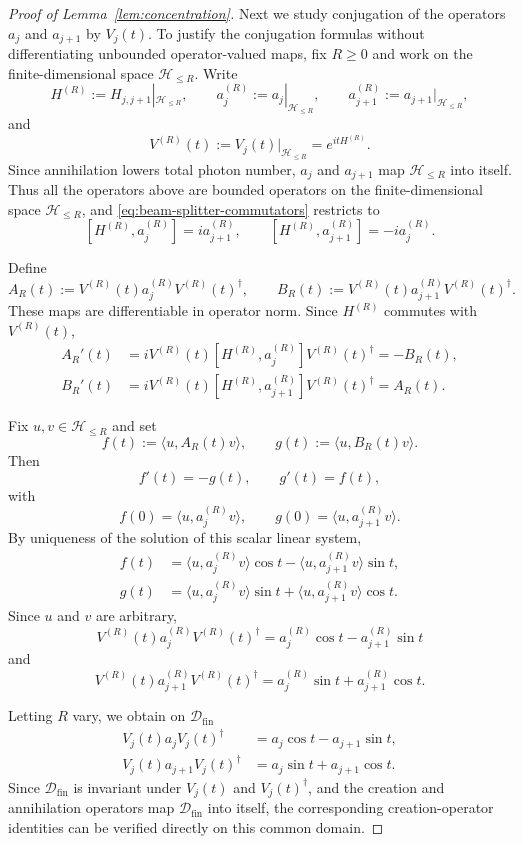 \documentclass{article}
\theoremstyle{named}
\theoremstyle{named1}
\newcommand{\cH}{\mathcal H}
\theoremstyle{plain}
\theoremstyle{remark}
\begin{document}
\begin{proof}[Proof of Lemma~\ref{lem:concentration}]
Next we study conjugation of the operators $a_j$ and $a_{j+1}$ by $V_j(t)$. To justify the conjugation formulas without differentiating unbounded
operator-valued maps, fix $R\geq0$ and work on the finite-dimensional
space $\cH_{\leq R}$.  Write
\[
    H^{(R)}
    :=
    H_{j,j+1}|_{\cH_{\leq R}},
    \qquad
    a_j^{(R)}
    :=
    a_j|_{\cH_{\leq R}},
    \qquad
    a_{j+1}^{(R)}
    :=
    a_{j+1}|_{\cH_{\leq R}},
\]
and
\[
    V^{(R)}(t)
    :=
    V_j(t)|_{\cH_{\leq R}}
    =
    e^{itH^{(R)}} .
\]
Since annihilation lowers total photon number, $a_j$ and $a_{j+1}$ map
$\cH_{\leq R}$ into itself.  Thus all the operators above are bounded
operators on the finite-dimensional space $\cH_{\leq R}$, and
\eqref{eq:beam-splitter-commutators} restricts to
\[
    [H^{(R)},a_j^{(R)}]
    =
    ia_{j+1}^{(R)},
    \qquad
    [H^{(R)},a_{j+1}^{(R)}]
    =
    -ia_j^{(R)}.
\]

Define
\[
    A_R(t)
    :=
    V^{(R)}(t)a_j^{(R)}V^{(R)}(t)^\dagger,
    \qquad
    B_R(t)
    :=
    V^{(R)}(t)a_{j+1}^{(R)}V^{(R)}(t)^\dagger .
\]
These maps are differentiable in operator norm.  Since
$H^{(R)}$ commutes with $V^{(R)}(t)$,
\begin{align*}
    A_R'(t)
    &=
    iV^{(R)}(t)
    [H^{(R)},a_j^{(R)}]
    V^{(R)}(t)^\dagger
    =
    -B_R(t),\\
    B_R'(t)
    &=
    iV^{(R)}(t)
    [H^{(R)},a_{j+1}^{(R)}]
    V^{(R)}(t)^\dagger
    =
    A_R(t).
\end{align*}

Fix $u,v\in\cH_{\leq R}$ and set
\[
    f(t)
    :=
    \langle u,A_R(t)v\rangle,
    \qquad
    g(t)
    :=
    \langle u,B_R(t)v\rangle .
\]
Then
\[
    f'(t)=-g(t),
    \qquad
    g'(t)=f(t),
\]
with
\[
    f(0)=\langle u,a_j^{(R)}v\rangle,
    \qquad
    g(0)=\langle u,a_{j+1}^{(R)}v\rangle.
\]
By uniqueness of the solution of this scalar linear system,
\begin{align*}
    f(t)
    &=
    \langle u,a_j^{(R)}v\rangle\cos t
    -
    \langle u,a_{j+1}^{(R)}v\rangle\sin t,\\
    g(t)
    &=
    \langle u,a_j^{(R)}v\rangle\sin t
    +
    \langle u,a_{j+1}^{(R)}v\rangle\cos t .
\end{align*}
Since $u$ and $v$ are arbitrary,
\[
    V^{(R)}(t)a_j^{(R)}V^{(R)}(t)^\dagger
    =
    a_j^{(R)}\cos t-a_{j+1}^{(R)}\sin t
\]
and
\[
    V^{(R)}(t)a_{j+1}^{(R)}V^{(R)}(t)^\dagger
    =
    a_j^{(R)}\sin t+a_{j+1}^{(R)}\cos t .
\]

Letting $R$ vary, we obtain on $\mathscr D_{\mathrm{fin}}$
\begin{align}
    V_j(t)a_jV_j(t)^\dagger
    &=
    a_j\cos t-a_{j+1}\sin t,
    \label{eq:mode-rotation-first}\\
    V_j(t)a_{j+1}V_j(t)^\dagger
    &=
    a_j\sin t+a_{j+1}\cos t.
    \label{eq:mode-rotation-second}
\end{align}
Since $\mathscr D_{\mathrm{fin}}$ is invariant under
$V_j(t)$ and $V_j(t)^\dagger$, and the creation and annihilation
operators map $\mathscr D_{\mathrm{fin}}$ into itself, the corresponding
creation-operator identities can be verified directly on this common
domain.


\end{proof}
\end{document}
